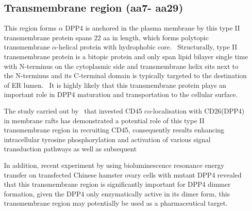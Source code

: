 \subsection{Transmembrane region (aa7- aa29)}

This region forms $\alpha$
DPP4 is anchored in the plasma membrane by this type II transmembrane protein spans 22 aa in length, which forms polytopic transmembrane $\alpha$-helical protein with hydrophobic core.~\cite{Hong_1990} Structurally, type II transmembrane protein is a bitopic protein and only span lipid bilayer single time with N-terminus on the cytoplasmic side and transmembrane helix sits next to the N-terminus and its C-terminal domain is typically targeted to the destination of ER lumen.~\cite{Luckey} It is highly likely that this transmembrane protein plays an important role in DPP4 maturation and transportation to the cellular surface. 
\par
The study carried out by~\citet{Ishii2001} that invested CD45 co-localisation with CD26(DPP4) in membrane rafts has demonstrated a potential role of this type II transmembrane region in recruiting CD45, consequently results enhancing intracellular tyrosine phosphorylation   and activation of various signal transduction pathways as well as subsequent 
\par
In addition, recent experiment by \citet{Chung_2010} using bioluminescence resonance energy transfer on transfected Chinese hamster ovary cells with mutant DPP4 revealed that this transmembrane region is significantly important for DPP4 dimmer formation, given the DPP4 only enzymatically active in its dimer form, this transmembrane region may potentially be used as a pharmaceutical target.

